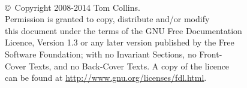 \begin{center}
\
\vspace{6cm}

\copyright\ Copyright 2008-2014 Tom Collins.\\[0.3cm]
Permission is granted to copy, distribute and/or modify\\ 
this document under the terms of the GNU Free Documentation\\ Licence, Version 1.3 or any later version published by the Free\\ Software Foundation; with no Invariant Sections, no Front-\\Cover Texts, and no Back-Cover Texts. A copy of the licence\\ can be found at \href{http://www.gnu.org/licenses/fdl.html}{http://www.gnu.org/licenses/fdl.html}.
\end{center}
